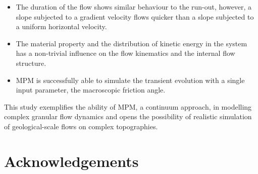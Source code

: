 \documentclass[3p,times,procedia,number]{elsarticle}
\begin{document}
\begin{itemize}
  \item The duration of the flow shows similar behaviour to the run-out, however, 
    a slope subjected to a gradient velocity flows quicker than a slope subjected 
    to a uniform horizontal velocity. 

  \item The material property and the distribution of kinetic energy in the 
    system has a non-trivial influence on the flow kinematics and the internal flow 
    structure.

  \item MPM is successfully able to simulate the transient evolution with a 
    single input parameter, the macroscopic friction angle.

\end{itemize}

This study exemplifies the ability of MPM, a continuum approach,  in modelling 
complex granular flow dynamics and opens the possibility of realistic 
simulation of geological-scale flows on complex topographies.

\section*{Acknowledgements}


 
\end{document}
